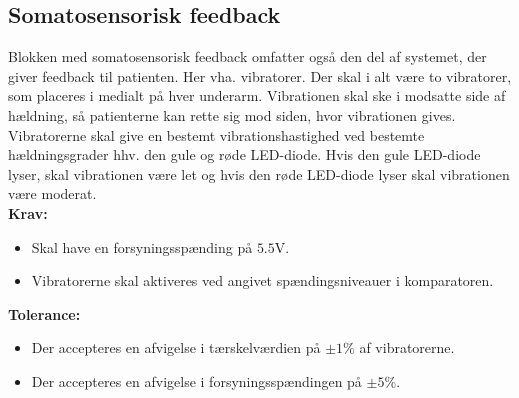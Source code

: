 \subsection{Somatosensorisk feedback} 
Blokken med somatosensorisk feedback omfatter også den del af systemet, der giver feedback til patienten. Her vha. vibratorer. Der skal i alt være to vibratorer, som placeres i medialt på hver underarm. Vibrationen skal ske i modsatte side af hældning, så patienterne kan rette sig mod siden, hvor vibrationen gives. Vibratorerne skal give en bestemt vibrationshastighed ved bestemte hældningsgrader hhv. den gule og røde LED-diode. Hvis den gule LED-diode lyser, skal vibrationen være let og hvis den røde LED-diode lyser skal vibrationen være moderat.
\\
\textbf{Krav:}
\begin{itemize}
	\item Skal have en forsyningsspænding på $5.5$V.
	\item Vibratorerne skal aktiveres ved angivet spændingsniveauer i komparatoren.
\end{itemize}
\textbf{Tolerance:}
\begin{itemize}
	\item Der accepteres en afvigelse i tærskelværdien på $\pm1\%$ af vibratorerne.
	\item Der accepteres en afvigelse i forsyningsspændingen på $\pm5\%$.
\end{itemize}

